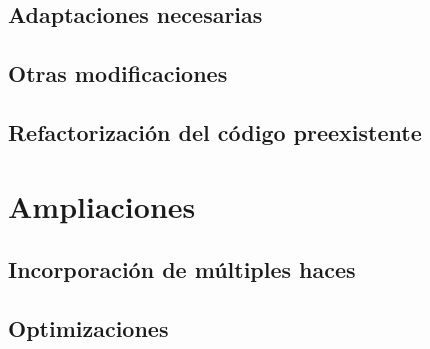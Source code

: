 \documentclass[../../main.tex]{subfiles}
\begin{document}
\subsection{Adaptaciones necesarias}
\subsection{Otras modificaciones}

\subsection{Refactorización del código preexistente}
\section{Ampliaciones}
\subsection{Incorporación de múltiples haces}
\subsection{Optimizaciones}
\end{document}
